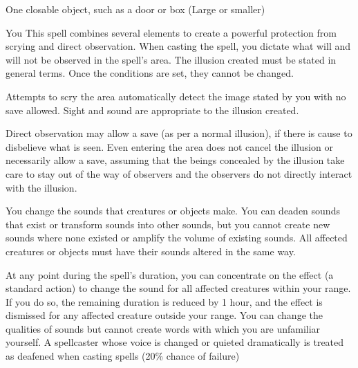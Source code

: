 \begin{spelltarget}{One closable object, such as a door or box (Large or smaller)}
\begin{spelltarget}{You}
\spelldur{\durext}
\spelleffect This spell combines several elements to create a powerful protection from scrying and direct observation. When casting the spell, you dictate what will and will not be observed in the spell's area. The illusion created must be stated in general terms. Once the conditions are set, they cannot be changed.
\par Attempts to scry the area automatically detect the image stated by you with no save allowed. Sight and sound are appropriate to the illusion created.
\par Direct observation may allow a save (as per a normal illusion), if there is cause to disbelieve what is seen. Even entering the area does not cancel the illusion or necessarily allow a save, assuming that the beings concealed by the illusion take care to stay out of the way of observers and the observers do not directly interact with the illusion.

\spelldur{\durext \dismissable}
\spelleffect You change the sounds that creatures or objects make. You can deaden sounds that exist or transform sounds into other sounds, but you cannot create new sounds where none existed or amplify the volume of existing sounds. All affected creatures or objects must have their sounds altered in the same way.

At any point during the spell's duration, you can concentrate on the effect (a standard action) to change the sound for all affected creatures within your range. If you do so, the remaining duration is reduced by 1 hour, and the effect is dismissed for any affected creature outside your range.
\spellnotes You can change the qualities of sounds but cannot create words with which you are unfamiliar yourself. A spellcaster whose voice is changed or quieted dramatically is treated as deafened when casting spells (20\% chance of failure)


\end{spelltarget}
\end{spelltarget}
